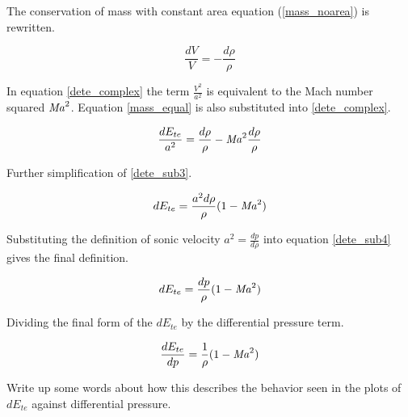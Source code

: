 \documentclass{article}
\newcommand\Mach{\mbox{\textit{Ma}}}  %
\begin{document}
The conservation of mass with constant area equation (\ref{mass_noarea}) is rewritten.

\begin{equation}
\frac{dV}{V} = - \frac{d\rho}{\rho}
\label{mass_equal}
\end{equation}

In equation \eqref{dete_complex} the term $\frac{V^2}{a^2}$ is equivalent to the Mach number squared $\Mach^2$. Equation \eqref{mass_equal} is also substituted into \eqref{dete_complex}.



\begin{equation}
\frac{dE_{te}}{a^2} = \frac{d\rho}{\rho} - \Mach^2\frac{d\rho}{\rho}
\label{dete_sub3} 
\end{equation}

Further simplification of \eqref{dete_sub3}.

\begin{equation}
dE_{te} = \frac{a^2d\rho}{\rho}(1 - \Mach^2)
\label{dete_sub4}    
\end{equation}

Substituting the definition of sonic velocity $a^2 = \frac{dp}{d\rho}$ into equation \eqref{dete_sub4} gives the final definition.

\begin{equation}
dE_{te} = \frac{dp}{\rho}(1 - \Mach^2)
\label{tee_final}    
\end{equation}

Dividing the final form of the $dE_{te}$ by the differential pressure term.

\begin{equation}
\frac{dE_{te}}{dp} = \frac{1}{\rho}(1 - \Mach^2)
\end{equation}

Write up some words about how this describes the behavior seen in the plots of $dE_{te}$ against differential pressure.
\end{document}
